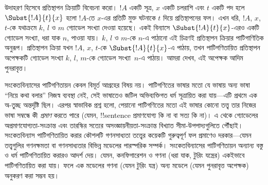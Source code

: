 \documentclass[../../../include/open-logic-section]{subfiles}
\begin{document}
উদাহরণ হিসেবে প্রতিস্থাপন ক্রিয়াটি বিবেচনা করো। $!A$ একটি সূত্র, $x$ একটি
চলরাশি এবং $t$ একটি পদ হলে $\Subst{!A}{t}{x}$ হলো $!A$-তে $x$-এর প্রতিটি
মুক্ত ঘটনাকে $t$ দিয়ে প্রতিস্থাপনের ফল। এখন ধরি, $!A$, $x$, $t$-কে যথাক্রমে
$k$, $l$ ও $m$ গ্যোডেল সংখ্যা দেওয়া হয়েছে। একই বিন্যাসে
$\Subst{!A}{t}{x}$-এরও একটি গ্যোডেল সংখ্যা, ধরা যাক $n$, পাওয়া যায়। $k$,
$l$ ও $m$-কে $n$-এ পাঠানো এই চিত্রণই প্রতিস্থাপন ক্রিয়ার পাটিগাণিতিক অনুরূপ।
প্রতিস্থাপন ক্রিয়া যখন $!A$, $x$, $t$-কে $\Subst{!A}{t}{x}$-এ পাঠায়, তখন
পাটিগণিতায়িত প্রতিস্থাপন অপেক্ষকটি গ্যোডেল সংখ্যা $k$, $l$, $m$-কে গ্যোডেল
সংখ্যা~$n$-এ পাঠায়। আমরা দেখব, এই অপেক্ষক আদিম পুনরাবৃত্ত।

সংকেতবিন্যাসের পাটিগণিতায়ন কেবল বিমূর্ত আগ্রহের বিষয় নয়। পাটিগণিতের ভাষার
মতো যে ভাষায় অন্য ভাষা ``নিয়ে কথা বলার'' নিজস্ব ব্যবস্থা নেই, সেই ভাষাতেও
জটিল অভিব্যক্তিগত ধর্ম সূত্রায়িত করা যায়—এটি প্রথমে এক অ-তুচ্ছ অন্তর্দৃষ্টি
ছিল। এরপর স্বাভাবিক প্রশ্ন হলো, পেয়ানো পাটিগণিতের
মতো এই ভাষার কোনো তত্ত্ব তার নিজের ভাষা সম্বন্ধে কী \emph{প্রমাণ} করতে পারে
(যেমন, !!{sentence} প্রমাণযোগ্য কি না বা সত্য কি না)। এ থেকে গ্যোডেলের
অপ্রমাণযোগ্যতা-সংক্রান্ত এবং তারস্কির সত্যের অসংজ্ঞায়নীয়তা-সংক্রান্ত বিখ্যাত
সীমা-উপপাদ্যগুলিতে পৌঁছাই। সংকেতবিন্যাস পাটিগণিতায়িত করার কৌশলটি গণনসাধ্যতা
তত্ত্বের কয়েকটি গুরুত্বপূর্ণ ফল প্রমাণেও দরকার—যেমন তত্ত্বগুলির গণনক্ষমতা বা
গণনসাধ্যতার বিভিন্ন মডেলের পারস্পরিক সম্পর্ক। সংকেতবিন্যাসের পাটিগণিতায়ন
অন্যান্য বস্তু ও ধর্ম পাটিগণিতায়িত করারও আদর্শ দেয়। যেমন, কনফিগারেশন ও গণনা
(ধরা যাক, টুরিং যন্ত্রের) একইভাবে পাটিগণিতায়িত করা যায়। ফলে এক মডেলের
গণনা (যেমন টুরিং যন্ত্র) অন্য মডেলে (যেমন পুনরাবৃত্ত অপেক্ষক) অনুকরণ করা
সম্ভব হয়।
\end{document}
